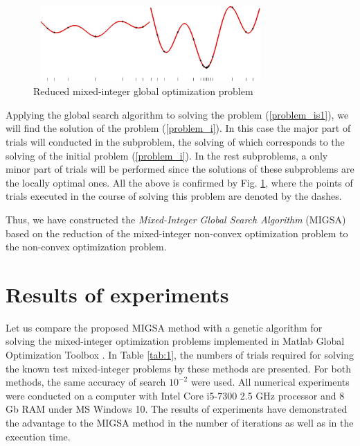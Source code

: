 \documentclass{llncs}
\begin{document}
\begin{figure}[ht]
    \centering
    \includegraphics[height=2.9cm,width=0.8\textwidth]{fig1.jpg}
    \caption{Reduced mixed-integer global optimization problem}
    \label{fig:1}
\end{figure}

Applying the global search algorithm to solving the problem (\ref{problem_is1}), we will find 
the solution of the problem (\ref{problem_i}). In this case the major part of trials will conducted in 
the subproblem, the solving of which corresponds to the solving of the initial 
problem (\ref{problem_i}). In the rest subproblems, a only minor part of trials will be performed 
since the solutions of these subproblems are the locally optimal ones.
All the above is confirmed by Fig. \ref{fig:1}, where the  
points of trials executed in the course of solving this problem are denoted by the dashes.


Thus, we have constructed the \textit{Mixed-Integer Global Search Algorithm} (MIGSA) based on the  
reduction of the mixed-integer non-convex optimization problem to the non-convex optimization problem. 

\section{Results of experiments}

Let us compare the proposed MIGSA method with a genetic algorithm for solving the mixed-integer optimization problems implemented in Matlab Global Optimization Toolbox \cite{Matlab}. In Table 
\ref{tab:1}, the numbers of trials required for solving the known test mixed-integer 
problems by these methods are presented. For both methods, the same accuracy of search $10^{-2}$ were used. All numerical experiments were conducted on a 
computer with Intel Core i5-7300 2.5 GHz processor and 8 Gb RAM under MS Windows 10. The 
results of experiments have demonstrated the advantage to the MIGSA method in the number 
of iterations as well as in the execution time.
\end{document}

